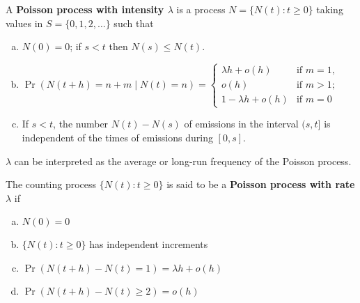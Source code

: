 \begin{definition}\label{stoch.pois.proc.def.grimmett}A \textbf{Poisson process with intensity \(\lambda\)} is a process \(N=\{N(t): t \geq 0 \}\) taking values in \(S=\{0, 1, 2, \ldots \}\) such that 

\begin{enumerate}[(a)]

\item \(N(0) = 0\); if \(s < t\) then \(N(s) \leq N(t)\).

\item \(\Pr(N(t+h) = n+m \mid N(t) =n) = \begin{cases}
\lambda h + o(h) & \text{if } m = 1, \\
o(h) & \text{if } m > 1; \\
1 - \lambda h + o(h) & \text{if } m=0
\end{cases}
\)

\item If \(s < t\), the number \(N(t) - N(s)\) of emissions in the interval \((s, t]\) is independent of the times of emissions during \([0,s]\).

\end{enumerate}

\end{definition}

\begin{remark}
\(\lambda\) can be interpreted as the average or long-run frequency of the Poisson process.
\end{remark}

\begin{definition}\label{stoch.pois.proc.def.ross.2.1.2}The counting process \(\{N(t): t\geq 0\}\) is said to be a  \textbf{Poisson process with rate \(\lambda\)} if

\begin{enumerate}[(a)]

\item \(N(0) = 0\)


\item \(\{N(t) : t \geq 0\}\) has independent increments

\item \(\Pr(N(t+h) - N(t) = 1) = \lambda h + o(h)\)

\item \(\Pr(N(t+h) - N(t) \geq 2) = o(h)\)


\end{enumerate}

\end{definition}

